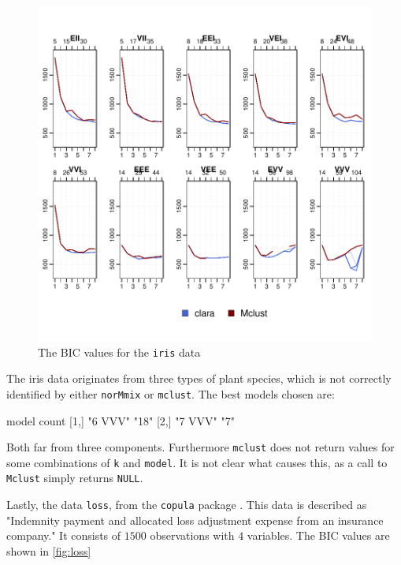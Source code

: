 \begin{figure}[h!]
    \begin{Rgraph}[0.9]
\includegraphics{chapter3-figtriris}
    \caption{The BIC values for the {\tt iris} data}
    \label{fig:triris}
    \end{Rgraph}
\end{figure}

The iris data originates from three types of plant species, which is not 
correctly identified by either {\tt norMmix} or {\tt mclust}. The best models
chosen are:

\begin{Schunk}
\begin{Soutput}
     model   count
[1,] "6 VVV" "18" 
[2,] "7 VVV" "7"  
\end{Soutput}
\end{Schunk}

Both far from three components. Furthermore {\tt mclust} does not return values
for some combinations of {\tt k} and {\tt model}. It is not clear what causes 
this, as a call to {\tt Mclust} simply returns {\tt NULL}.

Lastly, the data {\tt loss}, from the {\tt copula} package \cite{cop18}. This 
data is described as "Indemnity payment and allocated loss adjustment expense 
from an insurance company." It consists of $1500$ observations with $4$ 
variables. The BIC values are shown in \ref{fig:loss}

